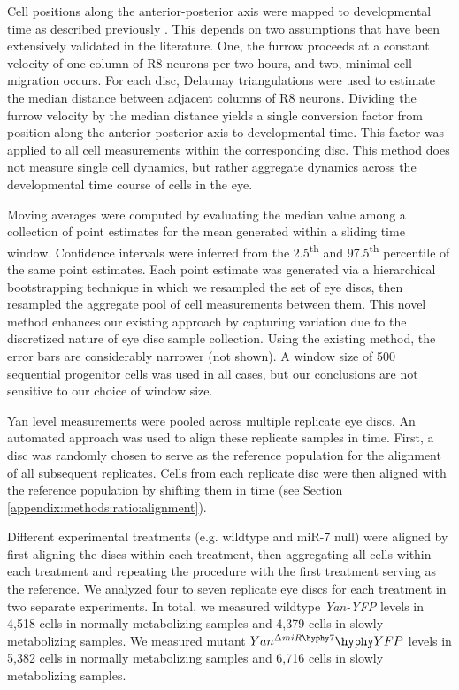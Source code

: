 Cell positions along the anterior-posterior axis were mapped to developmental time as described previously \cite{Pelaez2015a}. This depends on two assumptions that have been extensively validated in the literature. One, the furrow proceeds at a constant velocity of one column of R8 neurons per two hours, and two, minimal cell migration occurs. For each disc, Delaunay triangulations were used to estimate the median distance between adjacent columns of R8 neurons. Dividing the furrow velocity by the median distance yields a single conversion factor from position along the anterior-posterior axis to developmental time. This factor was applied to all cell measurements within the corresponding disc. This method does not measure single cell dynamics, but rather aggregate dynamics across the developmental time course of cells in the eye.

Moving averages were computed by evaluating the median value among a collection of point estimates for the mean generated within a sliding time window. Confidence intervals were inferred from the 2.5\textsuperscript{th} and 97.5\textsuperscript{th} percentile of the same point estimates. Each point estimate was generated via a hierarchical bootstrapping technique in which we resampled the set of eye discs, then resampled the aggregate pool of cell measurements between them. This novel method enhances our existing approach \cite{Pelaez2015a} by capturing variation due to the discretized nature of eye disc sample collection. Using the existing method, the error bars are considerably narrower (not shown). A window size of 500 sequential progenitor cells was used in all cases, but our conclusions are not sensitive to our choice of window size.

Yan level measurements were pooled across multiple replicate eye discs. An automated approach was used to align these replicate samples in time. First, a disc was randomly chosen to serve as the reference population for the alignment of all subsequent replicates. Cells from each replicate disc were then aligned with the reference population by shifting them in time (see Section \ref{appendix:methods:ratio:alignment}).

Different experimental treatments (e.g. wildtype and miR-7 null) were aligned by first aligning the discs within each treatment, then aggregating all cells within each treatment and repeating the procedure with the first treatment serving as the reference. We analyzed four to seven replicate eye discs for each treatment in two separate experiments. In total, we measured wildtype \textit{Yan-YFP} levels in 4,518 cells in normally metabolizing samples and 4,379 cells in slowly metabolizing samples. We measured mutant $Yan^{\Delta miR\hyphy 7}\hyphy YFP$ levels in 5,382 cells in normally metabolizing samples and 6,716 cells in slowly metabolizing samples.

